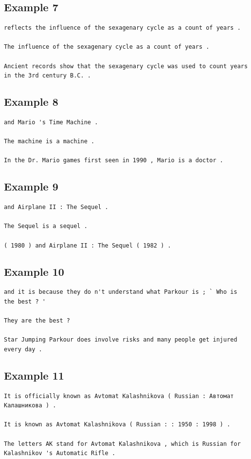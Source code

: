 \documentclass[11pt,twocolumn]{article}
\begin{document}
\subsection*{Example 7}
\label{app:7}
\begin{Verbatim}[fontsize=\scriptsize]
reflects the influence of the sexagenary cycle as a count of years .

The influence of the sexagenary cycle as a count of years .

Ancient records show that the sexagenary cycle was used to count years in the 3rd century B.C. .
\end{Verbatim}

\subsection*{Example 8}
\label{app:8}
\begin{Verbatim}[fontsize=\scriptsize]
and Mario 's Time Machine .

The machine is a machine .

In the Dr. Mario games first seen in 1990 , Mario is a doctor .
\end{Verbatim}

\subsection*{Example 9}
\label{app:9}
\begin{Verbatim}[fontsize=\scriptsize]
and Airplane II : The Sequel .

The Sequel is a sequel .

( 1980 ) and Airplane II : The Sequel ( 1982 ) .
\end{Verbatim}

\subsection*{Example 10}
\label{app:10}
\begin{Verbatim}[fontsize=\scriptsize]
and it is because they do n't understand what Parkour is ; ` Who is the best ? '

They are the best ?

Star Jumping Parkour does involve risks and many people get injured every day .
\end{Verbatim}

\subsection*{Example 11}
\label{app:11}
\begin{Verbatim}[fontsize=\scriptsize]
It is officially known as Avtomat Kalashnikova ( Russian : Автомат Калашникова ) .

It is known as Avtomat Kalashnikova ( Russian : : 1950 : 1998 ) .

The letters AK stand for Avtomat Kalashnikova , which is Russian for Kalashnikov 's Automatic Rifle .
\end{Verbatim}
\end{document}
